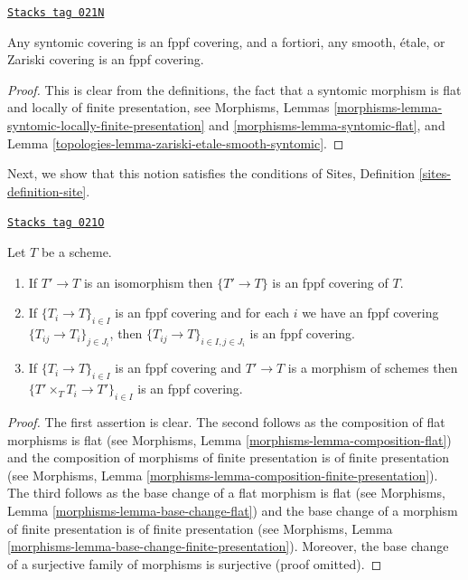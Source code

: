 \begin{lemma}
\label{topologies-lemma-zariski-etale-smooth-syntomic-fppf}
\href{https://stacks.math.columbia.edu/tag/021N}{\texttt{Stacks tag 021N}}

Any syntomic covering is an fppf covering, and a fortiori,
any smooth, \'etale, or Zariski covering is an fppf covering.
\end{lemma}

\begin{proof}

This is clear from the definitions, the fact that a syntomic morphism
is flat and locally of finite presentation, see
Morphisms, Lemmas
\ref{morphisms-lemma-syntomic-locally-finite-presentation} and
\ref{morphisms-lemma-syntomic-flat},
and
Lemma \ref{topologies-lemma-zariski-etale-smooth-syntomic}.
\end{proof}

Next, we show that this notion satisfies the conditions of
Sites, Definition \ref{sites-definition-site}.

\begin{lemma}[Fppf]
\label{topologies-lemma-fppf}
\href{https://stacks.math.columbia.edu/tag/021O}{\texttt{Stacks tag 021O}}

Let $T$ be a scheme.
\begin{enumerate}
\item If $T' \to T$ is an isomorphism then $\{T' \to T\}$
is an fppf covering of $T$.
\item If $\{T_i \to T\}_{i\in I}$ is an fppf covering and for each
$i$ we have an fppf covering $\{T_{ij} \to T_i\}_{j\in J_i}$, then
$\{T_{ij} \to T\}_{i \in I, j\in J_i}$ is an fppf covering.
\item If $\{T_i \to T\}_{i\in I}$ is an fppf covering
and $T' \to T$ is a morphism of schemes then
$\{T' \times_T T_i \to T'\}_{i\in I}$ is an fppf covering.
\end{enumerate}
\end{lemma}

\begin{proof}
The first assertion is clear.
The second follows as the composition of flat morphisms is flat
(see Morphisms, Lemma \ref{morphisms-lemma-composition-flat})
and the composition of morphisms of finite presentation is
of finite presentation
(see Morphisms, Lemma \ref{morphisms-lemma-composition-finite-presentation}).
The third follows as the base change of a flat morphism is flat
(see Morphisms, Lemma \ref{morphisms-lemma-base-change-flat})
and the base change of a morphism of finite presentation is
of finite presentation
(see Morphisms, Lemma \ref{morphisms-lemma-base-change-finite-presentation}).
Moreover, the base change of a surjective family of morphisms is surjective
(proof omitted).
\end{proof}

